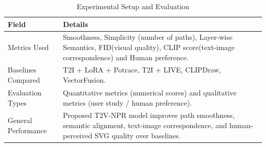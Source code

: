 \begin{table}[h!]
\centering
\caption{Experimental Setup and Evaluation}
\begin{tabular}{|l|p{10cm}|}
\hline
\textbf{Field} & \textbf{Details} \\ \hline
Metrics Used & Smoothness, Simplicity (number of paths), Layer-wise Semantics, FID(visual quality), CLIP score(text-image correspondence) and Human preference. \\ \hline
Baselines Compared & T2I + LoRA + Potrace, T2I + LIVE, CLIPDraw, VectorFusion. \\ \hline
Evaluation Types & Quantitative metrics (numerical scores) and qualitative metrics (user study / human preference). \\ \hline
General Performance & Proposed T2V-NPR model improves path smoothness, semantic alignment, text-image correspondence, and human-perceived SVG quality over baselines. \\ \hline
\end{tabular}
\end{table}

